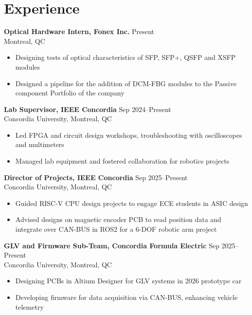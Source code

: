 \documentclass[10pt]{article}
\begin{document}
\section*{Experience}
\textbf{Optical Hardware Intern, Fonex Inc. } \hfill Present \\
Montreal, QC
\begin{itemize}
    \item Designing tests of optical characteristics of SFP, SFP+, QSFP and XSFP modules
    \item Designed a pipeline for the addition of DCM-FBG modules to the Passive component Portfolio of the company
\end{itemize}
\textbf{Lab Supervisor, IEEE Concordia} \hfill Sep 2024--Present \\
Concordia University, Montreal, QC
\begin{itemize}
    \item Led FPGA and circuit design workshops, troubleshooting with oscilloscopes and multimeters
    \item Managed lab equipment and fostered collaboration for robotics projects
\end{itemize}
\textbf{Director of Projects, IEEE Concordia} \hfill Sep 2025--Present \\
Concordia University, Montreal, QC
\begin{itemize}
    \item Guided RISC-V CPU design projects to engage ECE students in ASIC design
    \item Advised designs on magnetic encoder PCB to read position data and integrate over CAN-BUS in ROS2 for a 6-DOF robotic arm project
\end{itemize}
\textbf{GLV and Firmware Sub-Team, Concordia Formula Electric} \hfill Sep 2025--Present \\
Concordia University, Montreal, QC
\begin{itemize}
    \item Designing PCBs in Altium Designer for GLV systems in 2026 prototype car
    \item Developing firmware for data acquisition via CAN-BUS, enhancing vehicle telemetry
\end{itemize}

\end{document}
